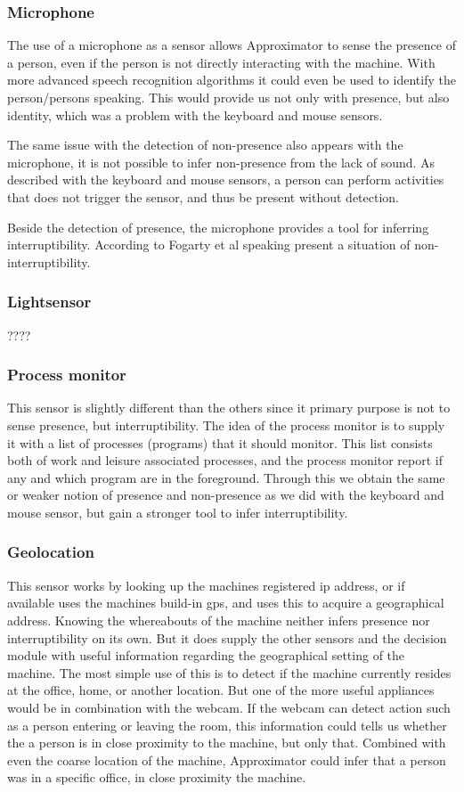 \documentclass{sigchi}
\begin{document}
\subsubsection{Microphone}
The use of a microphone as a sensor allows Approximator to sense the presence of a person, even if the person is not directly interacting with the machine.
With more advanced speech recognition algorithms it could even be used to identify the person/persons speaking.
This would provide us not only with presence, but also identity, which was a problem with the keyboard and mouse sensors.

The same issue with the detection of non-presence also appears with the microphone, it is not possible to infer non-presence from the lack of sound.
As described with the keyboard and mouse sensors, a person can perform activities that does not trigger the sensor, and thus be present without detection.

Beside the detection of presence, the microphone provides a tool for inferring interruptibility.
According to Fogarty et al\cite{fogarty2005predicting} speaking present a situation of non-interruptibility.
\subsubsection{Lightsensor}
????

\subsubsection{Process monitor}
This sensor is slightly different than the others since it primary purpose is not to sense presence, but interruptibility.
The idea of the process monitor is to supply it with a list of processes (programs) that it should monitor.
This list consists both of work and leisure associated processes, and the process monitor report if any and which program are in the foreground. %
Through this we obtain the same or weaker notion of presence and non-presence as we did with the keyboard and mouse sensor, but gain a stronger tool to infer interruptibility.

\subsubsection{Geolocation}
This sensor works by looking up the machines registered ip address, or if available uses the machines build-in gps, and uses this to acquire a geographical address.
Knowing the whereabouts of the machine neither infers presence nor interruptibility on its own.
But it does supply the other sensors and the decision module with useful information regarding the geographical setting of the machine.
The most simple use of this is to detect if the machine currently resides at the office, home, or another location.
But one of the more useful appliances would be in combination with the webcam.
If the webcam can detect action such as a person entering or leaving the room, this information could tells us whether the a person is in close proximity to the machine, but only that.
Combined with even the coarse location of the machine, Approximator could infer that a person was in a specific office, in close proximity the machine.
\end{document}
